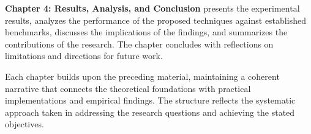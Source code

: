 \textbf{Chapter 4: Results, Analysis, and Conclusion} presents the experimental results, analyzes the performance of the proposed techniques against established benchmarks, discusses the implications of the findings, and summarizes the contributions of the research. The chapter concludes with reflections on limitations and directions for future work.

Each chapter builds upon the preceding material, maintaining a coherent narrative that connects the theoretical foundations with practical implementations and empirical findings. The structure reflects the systematic approach taken in addressing the research questions and achieving the stated objectives.